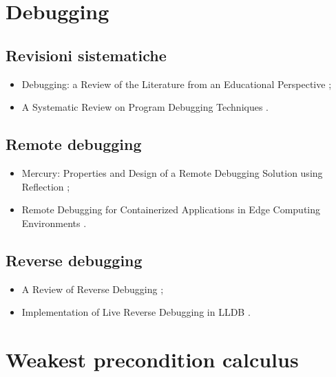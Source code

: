 \section*{Debugging}

\subsection*{Revisioni sistematiche}
\begin{itemize}

\item Debugging: a Review of the Literature from an Educational Perspective \cite{mccauley2008debugreview};

\item A Systematic Review on Program Debugging Techniques \cite{ghosh2019debugreview}.

\end{itemize}

\subsection*{Remote debugging}
\begin{itemize}

\item Mercury: Properties and Design of a Remote Debugging Solution using Reflection \cite{papoulias2015remotedebug};

\item Remote Debugging for Containerized Applications in Edge Computing Environments \cite{ozcan2019remotedebug}.

\end{itemize}

\subsection*{Reverse debugging}
\begin{itemize}

\item A Review of Reverse Debugging \cite{engblom2012reversedebug};

\item Implementation of Live Reverse Debugging in LLDB \cite{savidis2021reversedebug}.

\end{itemize}

\section*{Weakest precondition calculus}

